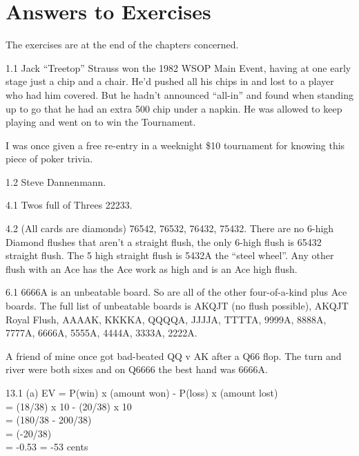 \chapter{Answers to Exercises}

The exercises are at the end of the chapters concerned.


1.1 Jack ``Treetop'' Strauss won the 1982 WSOP Main Event,
having at one early stage just a chip and a chair. He'd
pushed all his chips in and lost to a player who had him
covered. But he hadn't announced ``all-in'' and found when standing up
to go that he had an extra 500 chip under a napkin. He was allowed to
keep playing and went on to win the Tournament.

I was once given a free re-entry in a weeknight \$10 tournament for
knowing this piece of poker trivia.

1.2 Steve Dannenmann.


4.1 Twos full of Threes 22233.

4.2 (All cards are diamonds) 76542, 76532, 76432, 75432. There are no
6-high Diamond flushes that aren't a straight flush, the only 6-high
flush is 65432 straight flush. The 5 high straight flush is 5432A the
``steel wheel''. Any other flush with an Ace has the Ace work as high
and is an Ace high flush.

6.1 6666A is an unbeatable board. So are all of the other
four-of-a-kind plus Ace boards. The full list of unbeatable boards is
AKQJT (no flush possible), AKQJT Royal Flush, AAAAK, KKKKA, QQQQA,
JJJJA, TTTTA, 9999A, 8888A, 7777A, 6666A, 5555A, 4444A, 3333A, 2222A.

A friend of mine once got bad-beated QQ v AK after a Q66 flop. The
turn and river were both sixes and on Q6666 the best hand was 6666A.

13.1 (a) EV = P(win) x (amount won) - P(loss) x (amount lost) \\
= (18/38) x 10 - (20/38) x 10 \\
= (180/38 - 200/38) \\
= (-20/38) \\
= -0.53 = -53 cents

